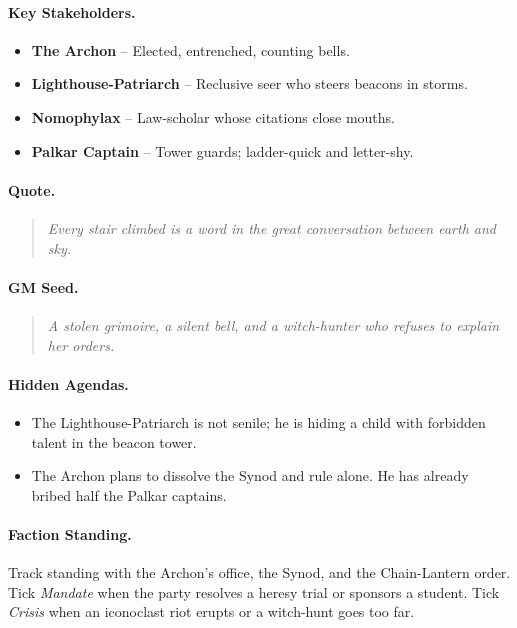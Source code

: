 \paragraph{Key Stakeholders.}
\begin{itemize}
  \item \textbf{The Archon} -- Elected, entrenched, counting bells.
  \item \textbf{Lighthouse-Patriarch} -- Reclusive seer who steers beacons in storms.
  \item \textbf{Nomophylax} -- Law-scholar whose citations close mouths.
  \item \textbf{Palkar Captain} -- Tower guards; ladder-quick and letter-shy.
\end{itemize}

\paragraph{Quote.}
\begin{quote}
\emph{\textquotedbl Every stair climbed is a word in the great conversation between earth and sky.\textquotedbl}
\end{quote}

\paragraph{GM Seed.}
\begin{quote}
\emph{A stolen grimoire, a silent bell, and a witch-hunter who refuses to explain her orders.}
\end{quote}

\paragraph{Hidden Agendas.}
\begin{itemize}
  \item The Lighthouse-Patriarch is not senile; he is hiding a child with forbidden talent in the beacon tower.
  \item The Archon plans to dissolve the Synod and rule alone. He has already bribed half the Palkar captains.
\end{itemize}

\paragraph{Faction Standing.}
Track standing with the Archon's office, the Synod, and the Chain-Lantern order. Tick \textit{Mandate} when the party resolves a heresy trial or sponsors a student. Tick \textit{Crisis} when an iconoclast riot erupts or a witch-hunt goes too far.

